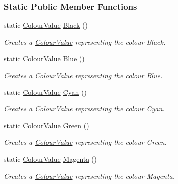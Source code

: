 \subsubsection*{Static Public Member Functions}
\begin{DoxyCompactItemize}
\item 
static \hyperlink{classphys_1_1ColourValue}{ColourValue} \hyperlink{classphys_1_1ColourValue_af9d049a7150ae445338410952ae41448}{Black} ()
\begin{DoxyCompactList}\small\item\em Creates a \hyperlink{classphys_1_1ColourValue}{ColourValue} representing the colour Black. \item\end{DoxyCompactList}\item 
static \hyperlink{classphys_1_1ColourValue}{ColourValue} \hyperlink{classphys_1_1ColourValue_aea3ab61fc98a5a5b4325780c11c712d8}{Blue} ()
\begin{DoxyCompactList}\small\item\em Creates a \hyperlink{classphys_1_1ColourValue}{ColourValue} representing the colour Blue. \item\end{DoxyCompactList}\item 
static \hyperlink{classphys_1_1ColourValue}{ColourValue} \hyperlink{classphys_1_1ColourValue_a1411e1bbb97fde45306342a90a7ce9a8}{Cyan} ()
\begin{DoxyCompactList}\small\item\em Creates a \hyperlink{classphys_1_1ColourValue}{ColourValue} representing the colour Cyan. \item\end{DoxyCompactList}\item 
static \hyperlink{classphys_1_1ColourValue}{ColourValue} \hyperlink{classphys_1_1ColourValue_a6b6cb20e01c6d3b66165bc773650d9dd}{Green} ()
\begin{DoxyCompactList}\small\item\em Creates a \hyperlink{classphys_1_1ColourValue}{ColourValue} representing the colour Green. \item\end{DoxyCompactList}\item 
static \hyperlink{classphys_1_1ColourValue}{ColourValue} \hyperlink{classphys_1_1ColourValue_a80b07a424539514f0a7410190dbc389d}{Magenta} ()
\begin{DoxyCompactList}\small\item\em Creates a \hyperlink{classphys_1_1ColourValue}{ColourValue} representing the colour Magenta. \item\end{DoxyCompactList}\item 

\end{DoxyCompactItemize}
